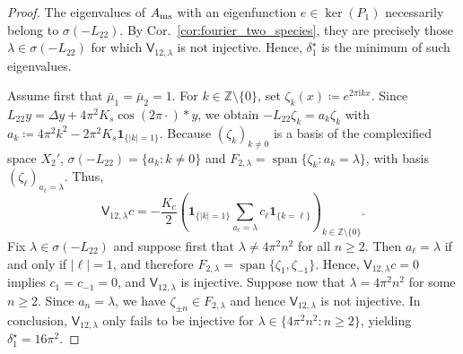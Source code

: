 \documentclass[letterpaper, 10pt, conference]{ieeeconf}
\newcommand{\ind}{\mathbf{1}}
\begin{document}
\begin{proof}
    The eigenvalues of $A_{\rm ms}$ with an eigenfunction $e \in \ker(P_1)$ necessarily belong to $\sigma(-L_{22})$.
    By Cor.~\ref{cor:fourier_two_species}, they are precisely those $\lambda \in \sigma(-L_{22})$ for which $\mathsf{V}_{12,\lambda}$ is not injective.
    Hence, $\delta_1^\star$ is the minimum of such eigenvalues.
    
    Assume first that $\bar\mu_1 = \bar\mu_2 = 1$.
    For $k \in \mathbb{Z} \setminus \{0\}$, set $\zeta_k(x) \coloneqq e^{2\pi \mathrm{i} k x}$.
    Since $L_{22}y = \Delta y + 4 \pi^2 K_s \cos(2\pi\cdot) \ast y$, we obtain $-L_{22}\zeta_k = a_k \zeta_k$ with $a_k \coloneqq 4 \pi^2 k^2 - 2 \pi^2 K_s \mathbf{1}_{\{|k|=1\}}$.
    Because $(\zeta_k)_{k \neq 0}$ is a basis of the complexified space $X_2'$, $\sigma(-L_{22}) = \{a_k : k \neq 0\}$ and $F_{2,\lambda} = \operatorname{span}\{\zeta_k : a_k = \lambda\}$, with basis $(\zeta_\ell)_{a_\ell = \lambda}$.
    Thus,
    \[
    \mathsf{V}_{12,\lambda}c = -\frac{K_c}{2} \left(\mathbf{1}_{\{|k|=1\}} \sum_{a_\ell = \lambda} c_\ell \ind_{\{k=\ell\}} \right)_{k \in \mathbb{Z} \setminus \{0\}}.
    \]
    Fix $\lambda \in \sigma(-L_{22})$ and suppose first that $\lambda \neq 4 \pi^2 n^2$ for all $n \ge 2$. 
    Then $a_\ell = \lambda$ if and only if $|\ell| = 1$, and therefore $F_{2,\lambda} = \operatorname{span}\{\zeta_1, \zeta_{-1}\}$.
    Hence, $\mathsf{V}_{12,\lambda}c = 0$ implies $c_1 = c_{-1} = 0$, and $\mathsf{V}_{12,\lambda}$ is injective.
    Suppose now that $\lambda = 4 \pi^2 n^2$ for some $n \ge 2$.
    Since $a_n = \lambda$, we have $\zeta_{\pm n} \in F_{2,\lambda}$ and hence $\mathsf{V}_{12,\lambda}$ is not injective.
    In conclusion, $\mathsf{V}_{12,\lambda}$ only fails to be injective for $\lambda \in \{4 \pi^2 n^2 : n \ge 2\}$, yielding $\delta_1^\star = 16\pi^2$.


\end{proof}
\end{document}
